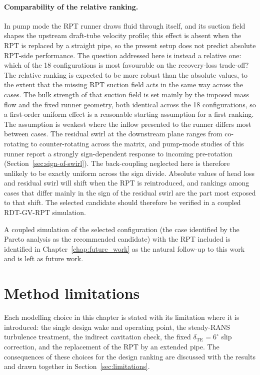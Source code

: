 \paragraph{Comparability of the relative ranking.} In pump mode the RPT runner draws fluid through itself, and its suction field shapes the upstream draft-tube velocity profile; this effect is absent when the RPT is replaced by a straight pipe, so the present setup does not predict absolute RPT-side performance. The question addressed here is instead a relative one: which of the 18 configurations is most favourable on the recovery-loss trade-off? The relative ranking is expected to be more robust than the absolute values, to the extent that the missing RPT suction field acts in the same way across the cases. The bulk strength of that suction field is set mainly by the imposed mass flow and the fixed runner geometry, both identical across the 18 configurations, so a first-order uniform effect is a reasonable starting assumption for a first ranking. The assumption is weakest where the inflow presented to the runner differs most between cases. The residual swirl at the downstream plane ranges from co-rotating to counter-rotating across the matrix, and pump-mode studies of this runner report a strongly sign-dependent response to incoming pre-rotation (Section~\ref{sec:sign-of-swirl}). The back-coupling neglected here is therefore unlikely to be exactly uniform across the sign divide. Absolute values of head loss and residual swirl will shift when the RPT is reintroduced, and rankings among cases that differ mainly in the sign of the residual swirl are the part most exposed to that shift. The selected candidate should therefore be verified in a coupled RDT-GV-RPT simulation.
 
A coupled simulation of the selected configuration (the case identified by the Pareto analysis as the recommended candidate) with the RPT included is identified in Chapter~\ref{chap:future_work} as the natural follow-up to this work and is left as future work.
 
\section{Method limitations}
\label{sec:methods_limitations_master}
 
Each modelling choice in this chapter is stated with its limitation where it is introduced: the single design wake and operating point, the steady-RANS turbulence treatment, the indirect cavitation check, the fixed $\delta_{\mathrm{TE}} = 6^\circ$ slip correction, and the replacement of the RPT by an extended pipe. The consequences of these choices for the design ranking are discussed with the results and drawn together in Section~\ref{sec:limitations}.

